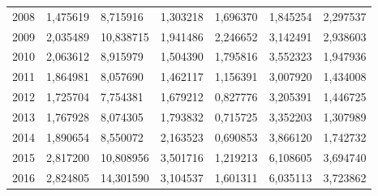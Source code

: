 \begin{table}
\begin{tabular}{p{1cm}p{2cm}p{2cm}p{2cm}p{2cm}p{2cm}p{2cm}}
 2008 &                            1,475619 &                                    8,715916 &                            1,303218 &                              1,696370 &                                     1,845254 &                    2,297537 \\
 2009 &                            2,035489 &                                   10,838715 &                            1,941486 &                              2,246652 &                                     3,142491 &                    2,938603 \\
 2010 &                            2,063612 &                                    8,915979 &                            1,504390 &                              1,795816 &                                     3,552323 &                    1,947936 \\
 2011 &                            1,864981 &                                    8,057690 &                            1,462117 &                              1,156391 &                                     3,007920 &                    1,434008 \\
 2012 &                            1,725704 &                                    7,754381 &                            1,679212 &                              0,827776 &                                     3,205391 &                    1,446725 \\
 2013 &                            1,767928 &                                    8,074305 &                            1,793832 &                              0,715725 &                                     3,352203 &                    1,307989 \\
 2014 &                            1,890654 &                                    8,550072 &                            2,163523 &                              0,690853 &                                     3,866120 &                    1,742732 \\
 2015 &                            2,817200 &                                   10,808956 &                            3,501716 &                              1,219213 &                                     6,108605 &                    3,694740 \\
 2016 &                            2,824805 &                                   14,301590 &                            3,104537 &                              1,601311 &                                     6,035113 &                    3,723862 \\
\bottomrule
\end{tabular}
\end{table}
